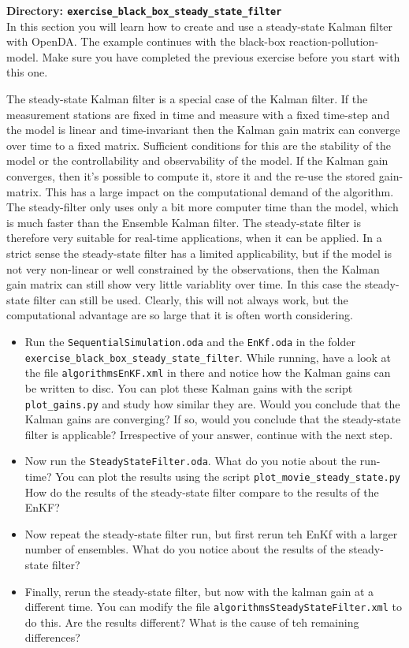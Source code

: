 {\bf Directory: {\tt exercise\_black\_box\_steady\_state\_filter}}\\

  In this section you will learn how to create and use a steady-state Kalman
  filter with OpenDA. The example continues with the black-box reaction-pollution-model. Make sure you have completed the previous exercise before you start with this one.

  The steady-state Kalman filter is a special case of the Kalman filter. If the measurement stations are fixed in time and measure with a fixed time-step and the model is linear and time-invariant then the Kalman gain matrix can converge over time to a fixed matrix. Sufficient conditions for this are the stability of the model or the controllability and observability of the model. If the Kalman gain converges, then it's possible to compute it, store it and the re-use the stored gain-matrix. This has a large impact on the computational demand of the algorithm. The steady-filter only uses only a bit more computer time than the model, which is much faster than the Ensemble Kalman filter. The steady-state filter is therefore very suitable for real-time applications, when it can be applied. In a strict sense the steady-state filter has a limited applicability, but if the model is not very non-linear or well constrained by the observations, then the Kalman gain matrix can still show very little variablity over time. In this case the steady-state filter can still be used. Clearly, this will not always work, but the computational advantage are so large that it is often worth considering.


\begin{itemize}
\item Run the {\tt SequentialSimulation.oda} and the {\tt EnKf.oda} in the folder {\tt exercise\_black\_box\_steady\_state\_filter}. While running, have a look at the file {\tt algorithms\/EnKF.xml} in there and notice how the Kalman gains can be written to disc. You can plot these Kalman gains with the script {\tt plot\_gains.py} and study how similar they are. Would you conclude that the Kalman gains are converging? If so, would you conclude that the steady-state filter is applicable? Irrespective of your answer, continue with the next step.

\item Now run the {\tt SteadyStateFilter.oda}. What do you notie about the run-time? You can plot the results using the script {\tt plot\_movie\_steady\_state.py} How do the results of the steady-state filter compare to the results of the EnKF? 

\item  Now repeat the steady-state filter run, but first rerun teh EnKf with a larger number of ensembles. What do you notice about the results of the steady-state filter?

\item Finally, rerun the steady-state filter, but now with the kalman gain at a different time. You can modify the file {\tt algorithms\/SteadyStateFilter.xml} to do this. Are the results different? What is the cause of teh remaining differences?
\end{itemize}
